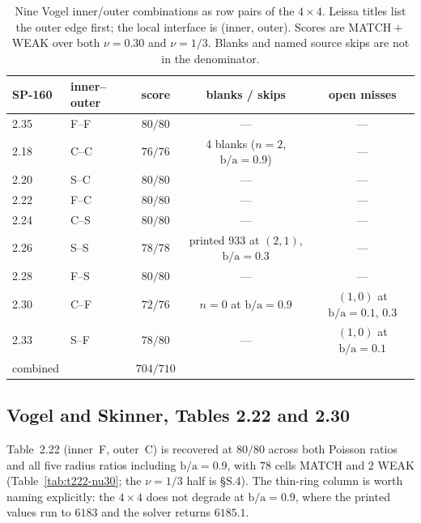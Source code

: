 \documentclass[11pt]{article}
\newcommand{\ba}{\mbox{b/a}}
\begin{document}
\begin{table}[htbp]\centering\small
\caption{Nine Vogel inner/outer combinations as row pairs of the
$4\times4$. Leissa titles list the outer edge first; the local interface is
(inner, outer). Scores are MATCH${}+{}$WEAK over both $\nu=0.30$ and
$\nu=1/3$. Blanks and named source skips are not in the denominator.}
\label{tab:nine}
\begin{tabular}{llccc}
\toprule
SP-160 & inner--outer & score & blanks / skips & open misses\\
\midrule
2.35 & F--F & $80/80$ & --- & --- \\
2.18 & C--C & $76/76$ & 4 blanks ($n=2$, $\ba=0.9$) & --- \\
2.20 & S--C & $80/80$ & --- & --- \\
2.22 & F--C & $80/80$ & --- & --- \\
2.24 & C--S & $80/80$ & --- & --- \\
2.26 & S--S & $78/78$ & printed $933$ at $(2,1)$, $\ba=0.3$ & --- \\
2.28 & F--S & $80/80$ & --- & --- \\
2.30 & C--F & $72/76$ & $n=0$ at $\ba=0.9$ & $(1,0)$ at $\ba=0.1$, $0.3$ \\
2.33 & S--F & $78/80$ & --- & $(1,0)$ at $\ba=0.1$ \\
\midrule
combined & & $704/710$ & & \\
\bottomrule
\end{tabular}
\end{table}

\subsection{Vogel and Skinner, Tables 2.22 and 2.30}\label{sec:t222}
Table~2.22 (inner~F, outer~C) is recovered at $80/80$ across both Poisson
ratios and all five radius ratios including $\ba=0.9$, with $78$ cells MATCH
and $2$ WEAK (Table~\ref{tab:t222-nu30}; the $\nu=1/3$ half is \S{}S.4). The
thin-ring column is worth naming explicitly: the $4\times4$ does not degrade
at $\ba=0.9$, where the printed values run to $6183$ and the solver returns
$6185.1$.
\end{document}
